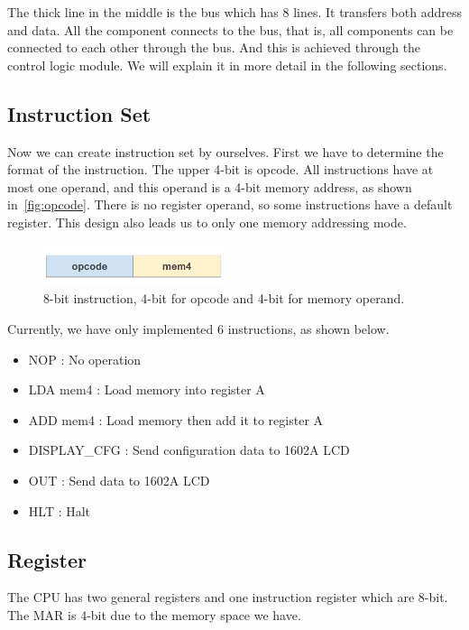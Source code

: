 The thick line in the middle is the bus which has 8 lines. It transfers both address and data. All the component connects to the bus, that is, all components can be connected to each other through the bus. And this is achieved through the control logic module. We will explain it in more detail in the following sections.


\subsection{Instruction Set}

Now we can create instruction set by ourselves. First we have to determine the format of the instruction. The upper 4-bit is opcode. All instructions have at most one operand, and this operand is a 4-bit memory address, as shown in~\autoref{fig:opcode}. There is no register operand, so some instructions have a default register. This design also leads us to only one memory addressing mode.

\begin{figure}[th]
	\includegraphics[width=0.47\textwidth]{figures/opcode}
	\centering
	\caption{8-bit instruction, 4-bit for opcode and 4-bit for memory operand.}
	\label{fig:opcode}
\end{figure}

Currently, we have only implemented 6 instructions, as shown below.

\begin{itemize}
	\item	NOP : No operation
	\item	LDA mem4 : Load memory into register A
	\item	ADD mem4 : Load memory then add it to register A
	\item	DISPLAY\_CFG : Send configuration data to 1602A LCD~\cite{1602a}
	\item	OUT : Send data to 1602A LCD
	\item	HLT : Halt
\end{itemize}

\subsection{Register}
The CPU has two general registers and one instruction register which are 8-bit. The MAR is 4-bit due to the memory space we have.

